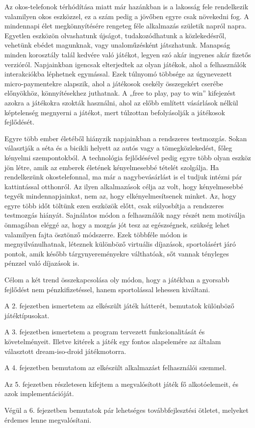 Az okos-telefonok térhódítása miatt már hazánkban is a lakosság fele rendelkezik valamilyen okos eszközzel, ez a szám pedig a jövőben egyre csak növekedni fog. 
A mindennapi élet megkönnyítésére rengeteg féle alkalmazás születik napról napra. 
Egyetlen eszközön olvashatunk újságot, tudakozódhatunk a közlekedésről, vehetünk ebédet magunknak, vagy unaloműzésként játszhatunk. 
Manapság minden korosztály talál kedvére való játékot, legyen szó akár ingyenes akár fizetős verzióról. 
Napjainkban igencsak elterjedtek az olyan játékok, ahol a felhasználók interakciókba léphetnek egymással. 
Ezek túlnyomó többsége az úgynevezett micro-paymentekre alapszik, ahol a játékosok csekély összegekért cserébe előnyökhöz, könnyítésekhez juthatnak. 
A „free to play, pay to win” kifejezést azokra a játékokra szokták használni, ahol az előbb említett vásárlások nélkül képtelenség megnyerni a játékot, mert túlzottan befolyásolják a játékosok fejlődését.

Egyre több ember életéből hiányzik napjainkban a rendszeres testmozgás. 
Sokan választják a séta és a bicikli helyett az autós vagy a tömegközlekedést, főleg kényelmi szempontokból. 
A technológia fejlődésével pedig egyre több olyan eszköz jön létre, amik az emberek életének kényelmesebbé tételét szolgálja. 
Ha rendelkezünk okostelefonnal, ma már a nagybevásárlást is el tudjuk intézni pár kattintással otthonról. 
Az ilyen alkalmazások célja az volt, hogy kényelmesebbé tegyék mindennapjainkat, nem az, hogy elkényelmesítsenek minket. 
Az, hogy egyre több időt töltünk ezen eszközök előtt, csak súlyosbítja a rendszeres testmozgás hiányát. 
Sajnálatos módon a felhasználók nagy részét nem motiválja önmagában eléggé az, hogy a mozgás jót tesz az egészségnek, szükség lehet valamilyen fajta ösztönző módszerre. 
Ezek többféle módon is megnyilvánulhatnak, léteznek különböző virtuális díjazások, sportolásért járó pontok, amik később tárgynyereményekre válthatóak, sőt vannak tényleges pénzzel való díjazások is.

Célom a két trend összekapcsolása oly módon, hogy a játékban a gyorsabb fejlődést nem pénzkifizetéssel, hanem sportolással lehessen kiváltani. 

A 2. fejezetben ismertetem az elkészült játék hátterét, bemutatok különböző játéktípusokat. 

A 3. fejezetben ismertetem a program tervezett funkcionalitását és követelményeit. 
Illetve kitérek a játék egy fontos alapelemére az általam választott dream-iso-droid játékmotorra. 

A 4. fejezetben bemutatom az elkészült alkalmazást felhasználói szemmel. 

Az 5. fejezetben részletesen kifejtem a megvalósított játék fő alkotóelemeit, és azok implementációját. 

Végül a 6. fejezetben bemutatok pár lehetséges továbbfejlesztési ötletet, melyeket érdemes lenne megvalósítani. 